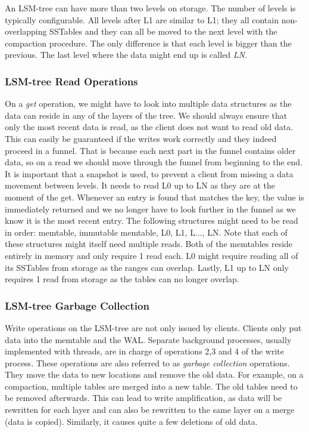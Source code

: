 An LSM-tree can have more than two levels on storage. The number of levels is typically configurable. All levels after L1 are similar to L1; they all contain non-overlapping SSTables and they can all be moved to the next level with the compaction procedure. The only difference is that each level is bigger than the previous. The last level where the data might end up is called \textit{LN}.

\subsubsection{LSM-tree Read Operations}
On a \textit{get} operation, we might have to look into multiple data structures as the data can reside in any of the layers of the tree. We should always ensure that only the most recent data is read, as the client does not want to read old data. This can easily be guaranteed if the writes work correctly and they indeed proceed in a funnel. That is because each next part in the funnel contains older data, so on a read we should move through the funnel from beginning to the end. It is important that a snapshot is used, to prevent a client from missing a data movement between levels. It needs to read L0 up to LN as they are at the moment of the get. Whenever an entry is found that matches the key, the value is immediately returned and we no longer have to look further in the funnel as we know it is the most recent entry. The following structures might need to be read in order: memtable, immutable memtable, L0, L1, L..., LN. Note that each of these structures might itself need multiple reads. Both of the memtables reside entirely in memory and only require 1 read each. L0 might require reading all of its SSTables from storage as the ranges can overlap. Lastly, L1 up to LN only requires 1 read from storage as the tables can no longer overlap. 

\subsubsection{LSM-tree Garbage Collection}
Write operations on the LSM-tree are not only issued by clients. Clients only put data into the memtable and the WAL. Separate background processes, usually implemented with threads, are in charge of operations 2,3 and 4 of the write process. These operations are also referred to as \textit{garbage collection} operations. They move the data to new locations and remove the old data. For example, on a compaction, multiple tables are merged into a new table. The old tables need to be removed afterwards. This can lead to write amplification, as data will be rewritten for each layer and can also be rewritten to the same layer on a merge (data is copied). Similarly, it causes quite a few deletions of old data.

